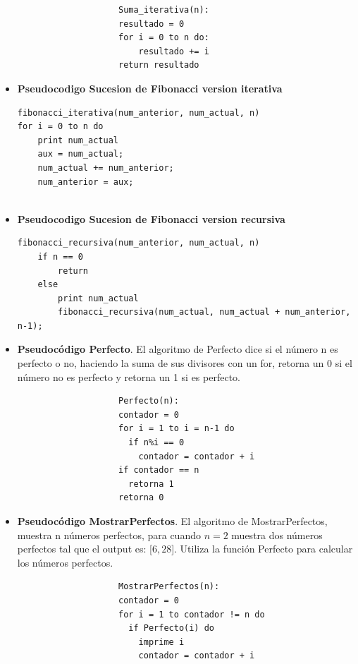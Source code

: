 \documentclass[12pt,twoside]{article}
\begin{document}
\begin{itemize}
\begin{centering}
\begin{verbatim}
                    Suma_iterativa(n):
                    resultado = 0
                    for i = 0 to n do:
                        resultado += i
                    return resultado
\end{verbatim}
\end{centering}
\newpage

\item \textbf{Pseudocodigo Sucesion de Fibonacci version iterativa}\\

\begin{centering}
\begin{verbatim}
fibonacci_iterativa(num_anterior, num_actual, n)
for i = 0 to n do
    print num_actual
    aux = num_actual;
    num_actual += num_anterior;
    num_anterior = aux;


\end{verbatim}
\end{centering}

\item \textbf{Pseudocodigo Sucesion de Fibonacci version recursiva}

\begin{centering}
\begin{verbatim}
fibonacci_recursiva(num_anterior, num_actual, n)
    if n == 0
        return
    else
        print num_actual
        fibonacci_recursiva(num_actual, num_actual + num_anterior, n-1); 

\end{verbatim}
\end{centering}

\item \textbf{Pseudocódigo Perfecto}.
El algoritmo de Perfecto dice si el número n es perfecto o no, haciendo la suma de sus divisores con un for, retorna un 0 si el número no es perfecto y retorna un 1 si es perfecto.
\begin{center}
\begin{verbatim}
                    Perfecto(n):
                    contador = 0
                    for i = 1 to i = n-1 do
                      if n%i == 0
                        contador = contador + i
                    if contador == n
                      retorna 1
                    retorna 0
\end{verbatim}
\end{center}
\newpage
\item \textbf{Pseudocódigo MostrarPerfectos}.
El algoritmo de MostrarPerfectos, muestra n números perfectos, para cuando $n=2$ muestra dos números perfectos tal que el output es: [$6,28$]. Utiliza la función Perfecto para calcular los números perfectos.
\begin{center}
\begin{verbatim}
                    MostrarPerfectos(n):
                    contador = 0
                    for i = 1 to contador != n do
                      if Perfecto(i) do
                        imprime i
                        contador = contador + i 
\end{verbatim}
\end{center}


\end{itemize}
\end{document}
